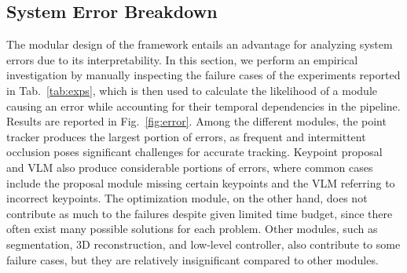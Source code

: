 \subsection{System Error Breakdown}\label{sec:error}


The modular design of the framework entails an advantage for analyzing system errors due to its interpretability.
In this section, we perform an empirical investigation by manually inspecting the failure cases of the experiments reported in Tab.~\ref{tab:exps}, which is then used to calculate the likelihood of a module causing an error while accounting for their temporal dependencies in the pipeline.
Results are reported in Fig.~\ref{fig:error}.
Among the different modules, the point tracker produces the largest portion of errors, as frequent and intermittent occlusion poses significant challenges for accurate tracking. %
Keypoint proposal and VLM also produce considerable portions of errors, where common cases include the proposal module missing certain keypoints and the VLM referring to incorrect keypoints.
The optimization module, on the other hand, does not contribute as much to the failures despite given limited time budget, since there often exist many possible solutions for each problem.
Other modules, such as segmentation, 3D reconstruction, and low-level controller, also contribute to some failure cases, but they are relatively insignificant compared to other modules.




